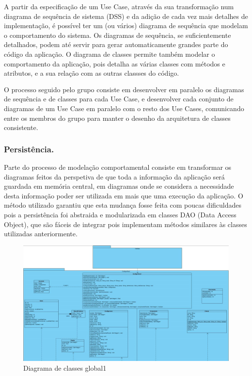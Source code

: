 \documentclass{llncs}
\newcommand\tab[1][0.5cm]{\hspace*{#1}}
\begin{document}
A partir da especificação de um Use Case, através da sua transformação num diagrama de sequência de sistema (DSS) e da adição de cada vez mais detalhes de implementação, é possível ter um (ou vários) diagrama de sequência que modelam o comportamento do sistema. Os diagramas de sequência, se suficientemente detalhados, podem até servir para gerar automaticamente grandes parte do código da aplicação. O diagrama de classes permite também modelar o comportamento da aplicação, pois detalha as várias classes com métodos e atributos, e a sua relação com as outras classses do código.

\tab O processo seguido pelo grupo consiste em desenvolver em paralelo os diagramas de sequência e de classes para cada Use Case, e desenvolver cada conjunto de diagramas de um Use Case em paralelo com o resto dos Use Cases, comunicando entre os membros do grupo para manter o desenho da arquitetura de classes consistente.

\subsubsection{Persistência.} %

Parte do processo de modelação comportamental consiste em transformar os diagramas feitos da perspetiva de que toda a informação da aplicação será guardada em memória central, em diagramas onde se considera a necessidade desta informação poder ser utilizada em mais que uma execução da aplicação. O método utilizado garantiu que esta mudança fosse feita com poucas dificuldades pois a persistência foi abstraida e modularizada em classes DAO (Data Access Object), que são fáceis de integrar pois implementam métodos similares às classes utilizadas anteriormente.

\begin{figure}
\begin{center}
\includegraphics[scale=0.33]{diagrama_classes_global1.jpg}
\end{center}
\caption{\label{fig:diagrama_classes_global1}Diagrama de classes global1}
\end{figure}
\end{document}
